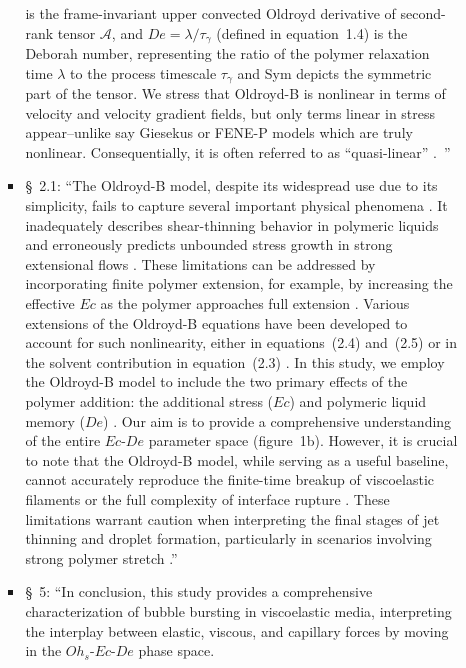 \documentclass[]{article}
\newcommand{\oo}{\color{magenta} \normalfont}
\newcommand{\bb}{\color{black} \normalfont}
\begin{document}
\begin{enumerate}
\begin{enumerate}
\begin{itemize}
        \noindent is the frame-invariant upper convected Oldroyd derivative of second-rank tensor $\boldsymbol{\mathcal{A}}$, and $De = \lambda/\tau_\gamma$ (defined in equation~1.4) is the Deborah number, representing the ratio of the polymer relaxation time $\lambda$ to the process timescale $\tau_\gamma$ and Sym depicts the symmetric part of the tensor. \oo We stress that Oldroyd-B is nonlinear in terms of velocity and velocity gradient fields, but only terms linear in stress appear--unlike say Giesekus or FENE-P models which are truly nonlinear.
        Consequentially, it is often referred to as ``quasi-linear” \citep{davoodi2018secondary, alves2021numerical}. \bb\,''
        \item \S~2.1: ``The Oldroyd-B model, despite its widespread use due to its simplicity, fails to capture several important physical phenomena \citep{snoeijer2020relationship}. It inadequately describes shear-thinning behavior in polymeric liquids \citep{yamani2023master} and erroneously predicts unbounded stress growth in strong extensional flows \citep{mckinley2002filament, eggers2020self}. 
        These limitations can be addressed by incorporating finite polymer extension, for example, by increasing the effective $Ec$ as the polymer approaches full extension \citep{hinch2021oldroyd,zinelis2023transition}. Various extensions of the Oldroyd-B equations have been developed to account for such nonlinearity, either in equations~(2.4) and~(2.5) or in the solvent contribution in equation~(2.3) \citep{de1974coil,tanner2000engineering,mckinley2002filament,alves2021numerical}. In this study, we employ the Oldroyd-B model to include the two primary effects of the polymer addition: the additional stress ($Ec$) and polymeric liquid memory ($De$) \citep{snoeijer2020relationship}. Our aim is to provide a comprehensive understanding of the entire $Ec$-$De$ parameter space (figure~1b).
        \oo 
        However, it is crucial to note that the Oldroyd-B model, while serving as a useful baseline, cannot accurately reproduce the finite-time breakup of viscoelastic filaments \citep{eggers2020self} or the full complexity of interface rupture \citep{lohse-2020-pnas}. These limitations warrant caution when interpreting the final stages of jet thinning and droplet formation, particularly in scenarios involving strong polymer stretch\bb.''
        \item \S~5: ``In conclusion, this study provides a comprehensive characterization of bubble bursting in viscoelastic media, interpreting the interplay between elastic, viscous, and capillary forces by moving in the $Oh_s$-$Ec$-$De$ phase space. 

\end{itemize}
\end{enumerate}
\end{enumerate}
\end{document}
